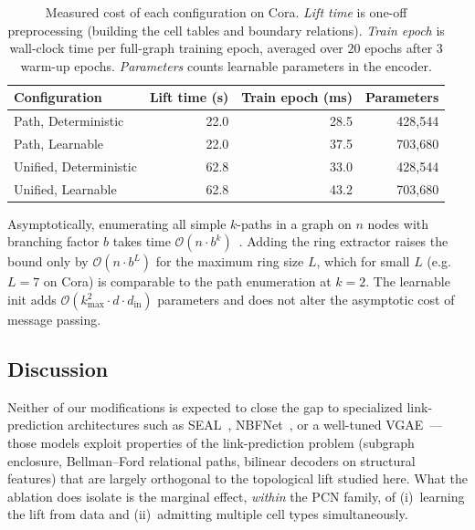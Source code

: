 \documentclass{article}
\begin{document}
\begin{table}[t]
  \centering
  \caption{Measured cost of each configuration on Cora. \emph{Lift time} is one-off preprocessing (building the cell tables and boundary relations). \emph{Train epoch} is wall-clock time per full-graph training epoch, averaged over $20$ epochs after $3$ warm-up epochs. \emph{Parameters} counts learnable parameters in the encoder.}
  \label{tab:cost}
  \begin{tabular}{lrrr}
    \toprule
    Configuration          & Lift time (s) & Train epoch (ms) & Parameters \\
    \midrule
    Path, Deterministic    & 22.0          & 28.5              & 428{,}544 \\
    Path, Learnable        & 22.0          & 37.5              & 703{,}680 \\
    Unified, Deterministic & 62.8          & 33.0              & 428{,}544 \\
    Unified, Learnable     & 62.8          & 43.2              & 703{,}680 \\
    \bottomrule
  \end{tabular}
\end{table}

Asymptotically, enumerating all simple $k$-paths in a graph on $n$ nodes with branching factor $b$ takes time $\mathcal{O}(n \cdot b^k)$~\citep{michel_expressive_2023, truong_weisfeiler_2024}. Adding the ring extractor raises the bound only by $\mathcal{O}(n \cdot b^L)$ for the maximum ring size $L$, which for small $L$ (e.g.\ $L = 7$ on Cora) is comparable to the path enumeration at $k = 2$. The learnable init adds $\mathcal{O}(k_\text{max}^2 \cdot d \cdot d_\text{in})$ parameters and does not alter the asymptotic cost of message passing.

\subsection{Discussion}
\label{subsec:discussion}
Neither of our modifications is expected to close the gap to specialized link-prediction architectures such as SEAL~\citep{zhang_link_2018}, NBFNet~\citep{zhu_neural_2021}, or a well-tuned VGAE~\citep{kipf_variational_2016}---those models exploit properties of the link-prediction problem (subgraph enclosure, Bellman--Ford relational paths, bilinear decoders on structural features) that are largely orthogonal to the topological lift studied here. What the ablation does isolate is the marginal effect, \emph{within} the PCN family, of (i)~learning the lift from data and (ii)~admitting multiple cell types simultaneously.
\end{document}
